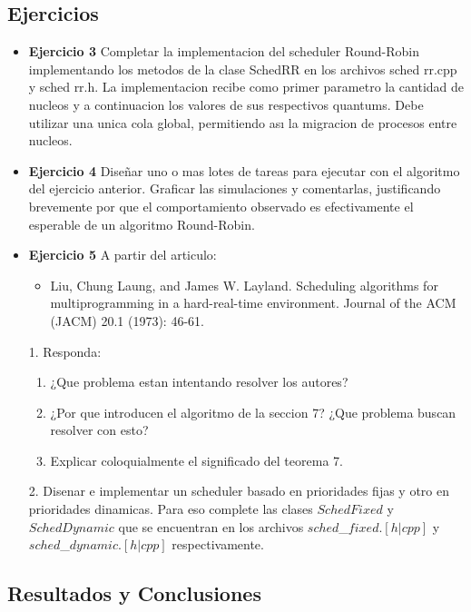 
\subsection{Ejercicios}
\begin{itemize}
 \item 
\textbf{Ejercicio 3}  Completar la implementacion del scheduler Round-Robin implementando los
metodos de la clase SchedRR en los archivos sched rr.cpp y sched rr.h. La implementacion
recibe como primer parametro la cantidad de nucleos y a continuacion los valores de sus
respectivos quantums. Debe utilizar una unica cola global, permitiendo ası la migracion de
procesos entre nucleos.
\item \textbf{Ejercicio 4} Diseñar uno o mas lotes de tareas para ejecutar con el algoritmo del ejercicio
anterior. Graficar las simulaciones y comentarlas, justificando brevemente por que el comportamiento 
observado es efectivamente el esperable de un algoritmo Round-Robin.
\item \textbf{Ejercicio 5} A partir del articulo:\\
\begin{itemize}
 \item Liu, Chung Laung, and James W. Layland. Scheduling algorithms for multiprogramming
in a hard-real-time environment. Journal of the ACM (JACM) 20.1 (1973): 46-61.
\end{itemize}
1. Responda:
\begin{enumerate}
 \item ¿Que problema estan intentando resolver los autores?
 \item ¿Por que introducen el algoritmo de la seccion 7? ¿Que problema buscan resolver
con esto?
\item Explicar coloquialmente el significado del teorema 7.
\end{enumerate}
2. Disenar e implementar un scheduler basado en prioridades fijas y otro en prioridades
dinamicas. Para eso complete las clases $SchedFixed$ y $SchedDynamic$ que se encuentran
en los archivos $sched$\_$fixed.[h|cpp]$ y $sched$\_$dynamic.[h|cpp]$ respectivamente.
\end{itemize}


\subsection{Resultados y Conclusiones}

